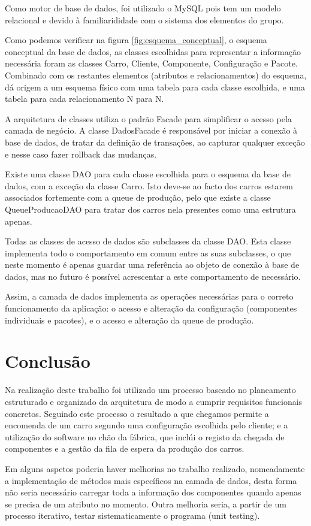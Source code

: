 \documentclass{llncs}
\newcommand\tab[1][0.5cm]{\hspace*{#1}}
\begin{document}
Como motor de base de dados, foi utilizado o MySQL pois tem um modelo relacional e devido à familiarididade com o sistema dos elementos do grupo.

\tab Como podemos verificar na figura \ref{fig:esquema_conceptual}, o esquema conceptual da base de dados, as classes escolhidas para representar a informação necessária foram as classes Carro, Cliente, Componente, Configuração e Pacote. Combinado com os restantes elementos (atributos e relacionamentos) do esquema, dá origem a um esquema físico com uma tabela para cada classe escolhida, e uma tabela para cada relacionamento N para N.

\tab A arquitetura de classes utiliza o padrão Facade para simplificar o acesso pela camada de negócio. A classe DadosFacade é responsável por iniciar a conexão à base de dados, de tratar da definição de transações, ao capturar qualquer exceção e nesse caso fazer rollback das mudanças.

\tab Existe uma classe DAO para cada classe escolhida para o esquema da base de dados, com a exceção da classe Carro. Isto deve-se ao facto dos carros estarem associados fortemente com a queue de produção, pelo que existe a classe QueueProducaoDAO para tratar dos carros nela presentes como uma estrutura apenas.

\tab Todas as classes de acesso de dados são subclasses da classe DAO. Esta classe implementa todo o comportamento em comum entre as suas subclasses, o que neste momento é apenas guardar uma referência ao objeto de conexão à base de dados, mas no futuro é possível acrescentar a este comportamento de necessário.

\tab Assim, a camada de dados implementa as operações necessárias para o correto funcionamento da aplicação: o acesso e alteração da configuração (componentes individuais e pacotes), e o acesso e alteração da queue de produção.

\clearpage
\section{Conclusão}

Na realização deste trabalho foi utilizado um processo baseado no planeamento estruturado e organizado da arquitetura de modo a cumprir requisitos funcionais concretos. Seguindo este processo o resultado a que chegamos permite a encomenda de um carro segundo uma configuração escolhida pelo cliente; e a utilização do software no chão da fábrica, que inclúi o registo da chegada de componentes e a gestão da fila de espera da produção dos carros. 

\tab Em alguns aspetos poderia haver melhorias no trabalho realizado, nomeadamente a implementação de métodos mais específicos na camada de dados, desta forma não seria necessário carregar toda a informação dos componentes quando apenas se precisa de um atributo no momento. Outra melhoria seria, a partir de um processo iterativo, testar sistematicamente o programa (unit testing).
\end{document}
